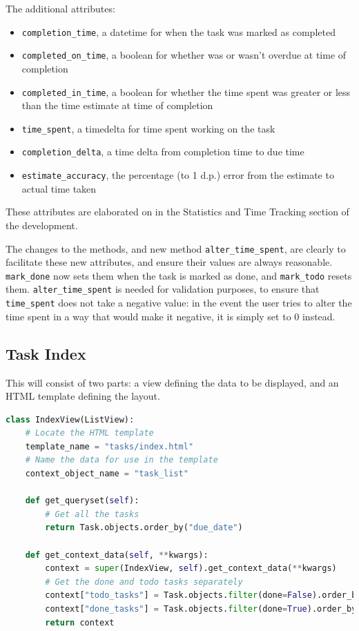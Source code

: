 \documentclass{article}
\begin{document}
The additional attributes:
\begin{samepage}
	\begin{itemize}
		\item \texttt{completion\_time},
		      a datetime for when the task was marked as completed
		\item \texttt{completed\_on\_time},
		      a boolean for whether was or wasn't overdue at time of completion
		\item \texttt{completed\_in\_time},
		      a boolean for whether the time spent was greater or less than the time estimate at time of completion
		\item \texttt{time\_spent},
		      a timedelta for time spent working on the task
		\item \texttt{completion\_delta},
		      a time delta from completion time to due time
		\item \texttt{estimate\_accuracy},
		      the percentage (to 1 d.p.) error from the estimate to actual time taken
	\end{itemize}
\end{samepage}

These attributes are elaborated on in the Statistics and Time Tracking section of the development.

The changes to the methods,
and new method \texttt{alter\_time\_spent},
are clearly to facilitate these new attributes,
and ensure their values are always reasonable.
\texttt{mark\_done} now sets them when the task is marked as done,
and \texttt{mark\_todo} resets them.
\texttt{alter\_time\_spent} is needed for validation purposes,
to ensure that \texttt{time\_spent} does not take a negative value:
in the event the user tries to alter the time spent in a way that would make it negative,
it is simply set to 0 instead.

\subsection{Task Index}
This will consist of two parts:
a view defining the data to be displayed,
and an HTML template defining the layout.

\begin{lstlisting}[language=Python]
class IndexView(ListView):
    # Locate the HTML template
    template_name = "tasks/index.html"
    # Name the data for use in the template
    context_object_name = "task_list"

    def get_queryset(self):
        # Get all the tasks
        return Task.objects.order_by("due_date")

    def get_context_data(self, **kwargs):
        context = super(IndexView, self).get_context_data(**kwargs)
        # Get the done and todo tasks separately
        context["todo_tasks"] = Task.objects.filter(done=False).order_by("due_date")
        context["done_tasks"] = Task.objects.filter(done=True).order_by("due_date")
        return context
\end{lstlisting}
\end{document}
